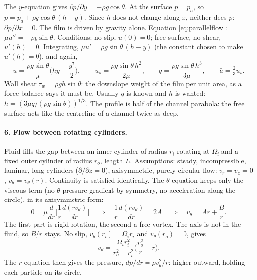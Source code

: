 The $y$-equation gives $\partial p/\partial y = -\rho g\cos\theta$. At the surface $p = p_a$, so $p = p_a + \rho g\cos\theta\,(h - y)$. Since $h$ does not change along $x$, neither does $p$: $\partial p/\partial x = 0$. The film is driven by gravity alone. Equation \eqref{eq:parallelflow}: $\mu u'' = -\rho g\sin\theta$. Conditions: no slip, $u(0) = 0$; free surface, no shear, $u'(h) = 0$. Integrating, $\mu u' = \rho g\sin\theta\,(h - y)$ (the constant chosen to make $u'(h) = 0$), and again,
\[
u = \frac{\rho g\sin\theta}{\mu}\Big(hy - \frac{y^2}{2}\Big), \qquad
u_s = \frac{\rho g\sin\theta\,h^2}{2\mu}, \qquad
q = \frac{\rho g\sin\theta\,h^3}{3\mu}, \qquad \bar u = \tfrac23 u_s .
\]
Wall shear $\tau_w = \rho g h\sin\theta$: the downslope weight of the film per unit area, as a force balance says it must be. Usually $q$ is known and $h$ is wanted: $h = (3\mu q/(\rho g\sin\theta))^{1/3}$. The profile is half of the channel parabola: the free surface acts like the centreline of a channel twice as deep.

\paragraph{6. Flow between rotating cylinders.} Fluid fills the gap between an inner cylinder of radius $r_i$ rotating at $\Omega_i$ and a fixed outer cylinder of radius $r_o$, length $L$. Assumptions: steady, incompressible, laminar, long cylinders ($\partial/\partial z = 0$), axisymmetric, purely circular flow: $v_r = v_z = 0$, $v_\theta = v_\theta(r)$. Continuity is satisfied identically. The $\theta$-equation keeps only the viscous term (no $\theta$ pressure gradient by symmetry, no acceleration along the circle), in its axisymmetric form:
\[
0 = \mu\frac{d}{dr}\Big[\frac{1}{r}\frac{d(r v_\theta)}{dr}\Big]
\quad\Longrightarrow\quad
\frac{1}{r}\frac{d(rv_\theta)}{dr} = 2A
\quad\Longrightarrow\quad
v_\theta = Ar + \frac{B}{r} .
\]
The first part is rigid rotation, the second a free vortex. The axis is not in the fluid, so $B/r$ stays. No slip, $v_\theta(r_i) = \Omega_i r_i$ and $v_\theta(r_o) = 0$, gives
\[
v_\theta = \frac{\Omega_i r_i^2}{r_o^2 - r_i^2}\Big(\frac{r_o^2}{r} - r\Big).
\]
The $r$-equation then gives the pressure, $dp/dr = \rho v_\theta^2/r$: higher outward, holding each particle on its circle.

